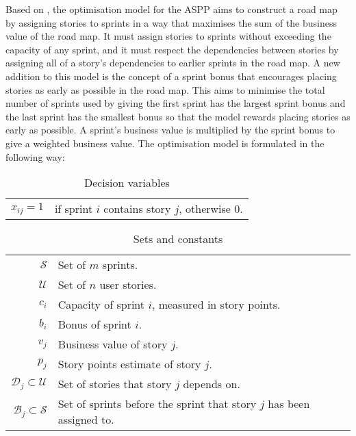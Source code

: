 Based on \citet{golfarelli2012sprint}, the optimisation model for the ASPP aims to construct a road map by assigning stories to sprints in a way that maximises the sum of the business value of the road map. It must assign stories to sprints without exceeding the capacity of any sprint, and it must respect the dependencies between stories by assigning all of a story's dependencies to earlier sprints in the road map. A new addition to this model is the concept of a sprint bonus that encourages placing stories as early as possible in the road map. This aims to minimise the total number of sprints used by giving the first sprint has the largest sprint bonus and the last sprint has the smallest bonus so that the model rewards placing stories as early as possible. A sprint's business value is multiplied by the sprint bonus to give a weighted business value. The optimisation model is formulated in the following way:

\begin{table}[h!]
\begin{center}
\begin{tabular}{rl} \label{}
    $x_{ij} = 1$    & if sprint $i$ contains story $j$, otherwise $0$.\\
\end{tabular}
\end{center}
\caption{Decision variables}
\label{tab:decision_variables}
\end{table}

\begin{table}[h!]
\begin{center}
\begin{tabular}{rl} \label{formulation:decision_variables}
    $\mathcal{S}$   & Set of $m$ sprints.\\
    $\mathcal{U}$   & Set of $n$ user stories.\\
    $c_i$           & Capacity of sprint $i$, measured in story points.\\
    $b_i$           & Bonus of sprint $i$.\\
    $v_j$           & Business value of story $j$.\\
    $p_j$           & Story points estimate of story $j$.\\
    $\mathcal{D}_j \subset \mathcal{U}$ & Set of stories that story $j$ depends on.\\
    $\mathcal{B}_j \subset \mathcal{S}$ & Set of sprints before the sprint that story $j$ has been assigned to.
\end{tabular}
\end{center}
\caption{Sets and constants}
\label{tab:parameters}
\end{table}

